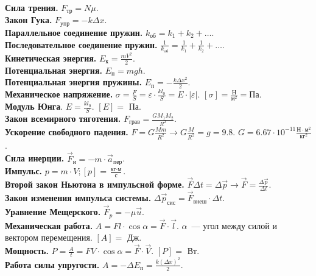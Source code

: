 \documentclass[12pt]{article}
\begin{document}
	\textbf{Сила трения.} $F_{\text{тр}} = N \mu$. \\
	\textbf{Закон Гука.} $F_{\text{упр}} = -k \varDelta x$. \\
	\textbf{Параллельное соединение пружин.} $k_{\text{об}} = k_1 + k_2 + \dots$. \\
	\textbf{Последовательное соединение пружин.} $\frac{1}{k_{\text{об}}} = \frac{1}{k_1} + \frac{1}{k_2} + \dots$. \\
	\textbf{Кинетическая энергия.} $E_{\text{к}} = \frac{mV^2}{2}$. \\
	\textbf{Потенциальная энергия.} $E_{\text{п}} = mgh$. \\
	\textbf{Потенциальная энергия пружины.} $E_{\text{п}} = -\frac{k \varDelta x^2}{2}$. \\
	\textbf{Механическое напряжение.} $\sigma = \frac{F}{S} = \varepsilon \cdot \frac{kl_0}{S} = E \cdot |\varepsilon|$. $[\sigma] = \frac{\text{Н}}{\text{м}^2} = \text{Па}$. \\
	\textbf{Модуль Юнга}. $E = \frac{kl_0}{S}$. $[E] =$ Па. \\
	\textbf{Закон всемирного тяготения.} $F_{\text{грав}} = \frac{GM_1M_2}{R^2}$. \\
	\textbf{Ускорение свободного падения.} $F = G \frac{Mm}{R^2} \rightarrow G \frac{M}{R^2} = g = 9.8$. $G = 6.67 \cdot 10^{-11} \frac{\text{Н} \cdot \text{м}^2}{\text{кг}^2}$. \\
	\textbf{Сила инерции.} $\vec{F}_{\text{и}} = -m \cdot \vec{a}_{\text{пер}}$. \\
	\textbf{Импульс.} $p = m \cdot V; [p] = \frac{\text{кг} \cdot \text{м}}{\text{с}}$. \\
	\textbf{Второй закон Ньютона в импульсной форме.} $\vec{F} \varDelta t = \varDelta \vec{p} \rightarrow \vec{F} = \frac{\varDelta \vec{p}}{\varDelta t}$. \\
	\textbf{Закон изменения импульса системы.} $\varDelta \vec{p}_{\text{сис}} = \vec{F}_{\text{внеш}} \cdot \varDelta t$. \\
	\textbf{Уравнение Мещерского.} $\vec{F}_{p} = -\mu \vec{u}$. \\
	\textbf{Механическая работа.} $A = Fl \cdot \cos \alpha = \vec{F} \cdot \vec{l}$. $\alpha$~--- угол между силой и вектором перемещения. $[A] =$ Дж. \\
	\textbf{Мощность.} $P = \frac{A}{t} = FV \cdot \cos \alpha = \vec{F} \cdot \vec{V}$. $[P] =$ Вт. \\
	\textbf{Работа силы упругости.} $A = -\varDelta E_{\text{п}} = \frac{k (\varDelta x)^2}{2}$. \\
\end{document}
